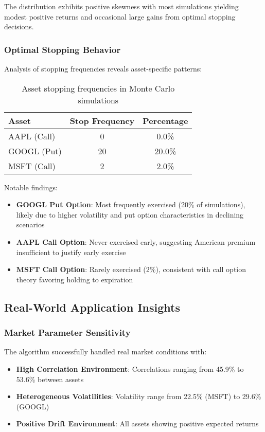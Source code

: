 \documentclass[11pt]{article}
\begin{document}
The distribution exhibits positive skewness with most simulations yielding modest positive returns and occasional large gains from optimal stopping decisions.

\subsubsection{Optimal Stopping Behavior}
Analysis of stopping frequencies reveals asset-specific patterns:

\begin{table}[h]
\centering
\begin{tabular}{lcc}
\toprule
\textbf{Asset} & \textbf{Stop Frequency} & \textbf{Percentage} \\
\midrule
AAPL (Call) & 0 & 0.0\% \\
GOOGL (Put) & 20 & 20.0\% \\
MSFT (Call) & 2 & 2.0\% \\
\bottomrule
\end{tabular}
\caption{Asset stopping frequencies in Monte Carlo simulations}
\label{tab:stopping_freq}
\end{table}

Notable findings:
\begin{itemize}
\item \textbf{GOOGL Put Option}: Most frequently exercised (20\% of simulations), likely due to higher volatility and put option characteristics in declining scenarios
\item \textbf{AAPL Call Option}: Never exercised early, suggesting American premium insufficient to justify early exercise
\item \textbf{MSFT Call Option}: Rarely exercised (2\%), consistent with call option theory favoring holding to expiration
\end{itemize}

\subsection{Real-World Application Insights}

\subsubsection{Market Parameter Sensitivity}
The algorithm successfully handled real market conditions with:
\begin{itemize}
\item \textbf{High Correlation Environment}: Correlations ranging from 45.9\% to 53.6\% between assets
\item \textbf{Heterogeneous Volatilities}: Volatility range from 22.5\% (MSFT) to 29.6\% (GOOGL)
\item \textbf{Positive Drift Environment}: All assets showing positive expected returns
\end{itemize}
\end{document}
